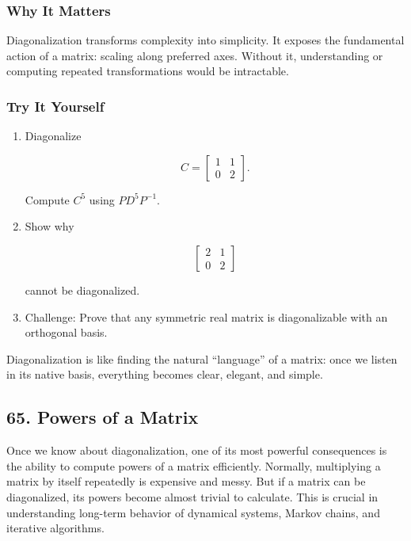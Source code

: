 \documentclass[
  letterpaper,
  DIV=11,
  numbers=noendperiod]{scrreprt}
\begin{document}
\subsubsection{Why It Matters}\label{why-it-matters-60}

Diagonalization transforms complexity into simplicity. It exposes the
fundamental action of a matrix: scaling along preferred axes. Without
it, understanding or computing repeated transformations would be
intractable.

\subsubsection{Try It Yourself}\label{try-it-yourself-63}

\begin{enumerate}
\def\labelenumi{\arabic{enumi}.}
\item
  Diagonalize

  \[
  C = \begin{bmatrix} 1 & 1 \\ 0 & 2 \end{bmatrix}.
  \]

  Compute \(C^5\) using \(P D^5 P^{-1}\).
\item
  Show why

  \[
  \begin{bmatrix} 2 & 1 \\ 0 & 2 \end{bmatrix}
  \]

  cannot be diagonalized.
\item
  Challenge: Prove that any symmetric real matrix is diagonalizable with
  an orthogonal basis.
\end{enumerate}

Diagonalization is like finding the natural ``language'' of a matrix:
once we listen in its native basis, everything becomes clear, elegant,
and simple.

\subsection{65. Powers of a Matrix}\label{powers-of-a-matrix}

Once we know about diagonalization, one of its most powerful
consequences is the ability to compute powers of a matrix efficiently.
Normally, multiplying a matrix by itself repeatedly is expensive and
messy. But if a matrix can be diagonalized, its powers become almost
trivial to calculate. This is crucial in understanding long-term
behavior of dynamical systems, Markov chains, and iterative algorithms.
\end{document}
